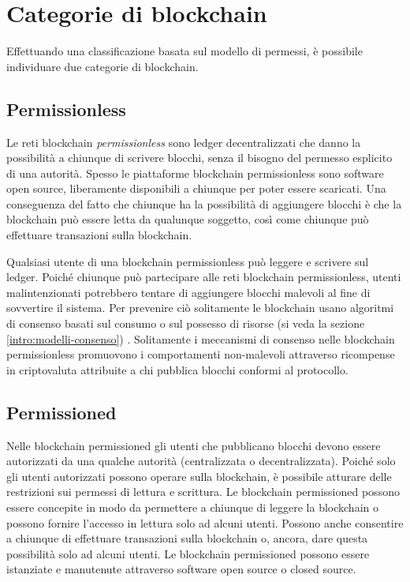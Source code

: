 \section{Categorie di blockchain}
Effettuando una classificazione basata sul modello di permessi,
è possibile individuare due categorie di blockchain.

\subsection{Permissionless}
\label{intro:permissionless}
Le reti blockchain \textit{permissionless} sono ledger decentralizzati che danno la possibilità
a chiunque di scrivere blocchi, senza il bisogno del permesso esplicito di una autorità.
Spesso le piattaforme blockchain permissionless sono software open source, liberamente
disponibili a chiunque per poter essere scaricati. Una conseguenza del fatto che
chiunque ha la possibilità di aggiungere blocchi è che la blockchain può essere letta da 
qualunque soggetto,
così come chiunque può effettuare transazioni sulla blockchain.

Qualsiasi utente di una blockchain permissionless può leggere e scrivere sul ledger.
Poiché chiunque può partecipare alle reti blockchain permissionless, utenti malintenzionati
potrebbero tentare di aggiungere blocchi malevoli al fine di sovvertire il sistema.
Per prevenire ciò solitamente le blockchain usano algoritmi di consenso
basati sul consumo o sul possesso di risorse (si veda la sezione \ref{intro:modelli-consenso}) .
Solitamente i meccanismi di consenso nelle blockchain
permissionless promuovono i comportamenti non-malevoli attraverso ricompense in criptovaluta
attribuite a chi pubblica blocchi conformi al protocollo.

\subsection{Permissioned}
Nelle blockchain permissioned gli utenti che pubblicano blocchi devono essere autorizzati da una
qualche autorità (centralizzata o decentralizzata). Poiché solo gli utenti autorizzati possono operare
sulla blockchain, è possibile atturare delle restrizioni sui permessi di lettura e scrittura.
Le blockchain permissioned possono essere concepite in modo da permettere a chiunque di
leggere la blockchain o possono fornire l'accesso in lettura solo ad alcuni utenti.
Possono anche consentire a chiunque di effettuare transazioni sulla blockchain o, ancora,
dare questa possibilità solo ad alcuni utenti. Le blockchain permissioned possono essere
istanziate e manutenute attraverso software open source o closed source.


